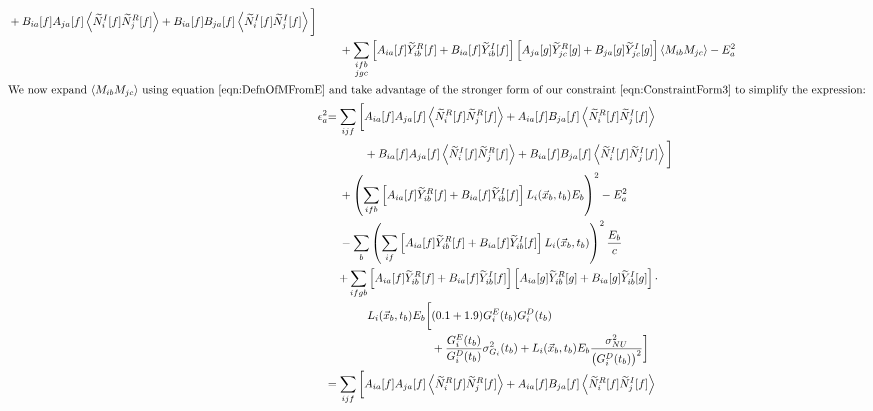 \begin{align}
\begin{aligned}
  & + B_{ia}[f]A_{ja}[f] \left<\widetilde{N}_i^I[f]\widetilde{N}_j^R[f]\right> + B_{ia}[f]B_{ja}[f] \left<\widetilde{N}_i^I[f]\widetilde{N}_j^I[f]\right>\bigg] \end{aligned} \nonumber \\
&\quad + \sum_{\substack{ifb\\jgc}} \left[A_{ia}[f] \widetilde{Y}_{ib}^R[f] + B_{ia}[f] \widetilde{Y}_{ib}^I[f]\right]\left[A_{ja}[g] \widetilde{Y}_{jc}^R[g] + B_{ja}[g] \widetilde{Y}_{jc}^I[g]\right] \left<M_{ib}M_{jc}\right> - E^2_a \\
%
\intertext{We now expand $\left<M_{ib}M_{jc}\right>$ using equation~\ref{eqn:DefnOfMFromE} and take advantage of the stronger form of our constraint~\ref{eqn:ConstraintForm3} to simplify the expression:}
%
\epsilon^2_a & \begin{aligned}[t]
  = \sum_{ijf} \bigg[ & A_{ia}[f]A_{ja}[f] \left<\widetilde{N}_i^R[f]\widetilde{N}_j^R[f]\right> + A_{ia}[f]B_{ja}[f] \left<\widetilde{N}_i^R[f]\widetilde{N}_j^I[f]\right> \\
  & + B_{ia}[f]A_{ja}[f] \left<\widetilde{N}_i^I[f]\widetilde{N}_j^R[f]\right> + B_{ia}[f]B_{ja}[f] \left<\widetilde{N}_i^I[f]\widetilde{N}_j^I[f]\right>\bigg] \end{aligned} \nonumber \\
&\quad + \left( \sum_{ifb} \left[A_{ia}[f] \widetilde{Y}_{ib}^R[f] + B_{ia}[f] \widetilde{Y}_{ib}^I[f]\right] L_i(\vec{x}_b,t_b) E_b \right)^2 - E^2_a \nonumber \\
&\quad - \sum_b \left( \sum_{if} \left[A_{ia}[f] \widetilde{Y}_{ib}^R[f] + B_{ia}[f] \widetilde{Y}_{ib}^I[f]\right] L_i(\vec{x}_b,t_b) \right)^2 \frac{E_b}{c} \nonumber \\
&\quad \begin{aligned}
  + \sum_{ifgb} &\left[A_{ia}[f] \widetilde{Y}_{ib}^R[f] + B_{ia}[f] \widetilde{Y}_{ib}^I[f]\right]\left[A_{ia}[g] \widetilde{Y}_{ib}^R[g] + B_{ia}[g] \widetilde{Y}_{ib}^I[g]\right] \cdot \\
  & \begin{aligned}
    L_i(\vec{x}_b,t_b) E_b \bigg[ &(0.1 + 1.9) G^E_i(t_b) G^D_i(t_b) \\
    & + \frac{G^E_i(t_b)}{G^D_i(t_b)} \sigma^2_{G_i}(t_b) + L_i(\vec{x}_b,t_b) E_b \frac{\sigma^2_{NU}}{\left(G^D_i(t_b)\right)^2} \bigg]
\end{aligned} \end{aligned} \\
%
& \begin{aligned}
  = \sum_{ijf} \bigg[ & A_{ia}[f]A_{ja}[f] \left<\widetilde{N}_i^R[f]\widetilde{N}_j^R[f]\right> + A_{ia}[f]B_{ja}[f] \left<\widetilde{N}_i^R[f]\widetilde{N}_j^I[f]\right> \\

\end{aligned}
\end{align}
